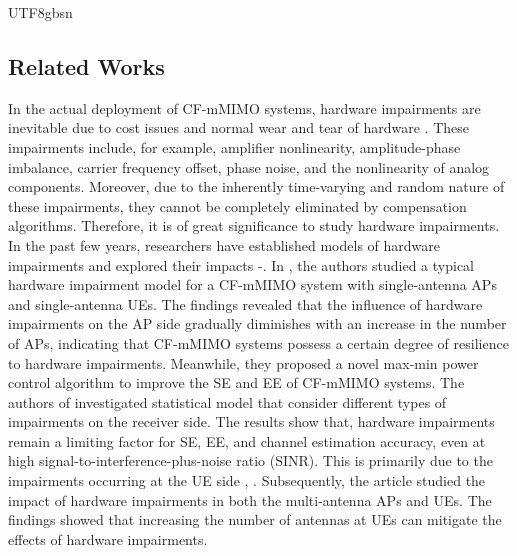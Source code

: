 \documentclass[lettersize,journal]{IEEEtran}
\begin{document}
\begin{CJK}{UTF8}{gbsn}
\subsection{Related Works}
In the actual deployment of CF-mMIMO systems, hardware impairments are inevitable due to cost issues and normal wear and tear of hardware \cite{paperIA1}. These impairments include, for example, amplifier nonlinearity, amplitude-phase imbalance, carrier frequency offset, phase noise, and the nonlinearity of analog components. Moreover, due to the inherently time-varying and random nature of these impairments, they cannot be completely eliminated by compensation algorithms. Therefore, it is of great significance to study hardware impairments. In the past few years, researchers have established models of hardware impairments and explored their impacts \cite{paperIA1}-\cite{paperIA4}. In \cite{paperIA1}, the authors studied a typical hardware impairment model for a CF-mMIMO system with single-antenna APs and single-antenna UEs. The findings revealed that the influence of hardware impairments on the AP side gradually diminishes with an increase in the number of APs, indicating that CF-mMIMO systems possess a certain degree of resilience to hardware impairments. Meanwhile, they proposed a novel max-min power control algorithm to improve the SE and EE of CF-mMIMO systems. The authors of \cite{paperIA5} investigated statistical model that consider different types of impairments on the receiver side. The results show that, hardware impairments remain a limiting factor for SE, EE, and channel estimation accuracy, even at high signal-to-interference-plus-noise ratio (SINR). This is primarily due to the impairments occurring at the UE side \cite{paperIA6}, \cite{paperIA7}. Subsequently, the article \cite{paperIA8} studied the impact of hardware impairments in both the multi-antenna APs and UEs. The findings showed that increasing the number of antennas at UEs can mitigate the effects of hardware impairments. 


\end{CJK}
\end{document}
